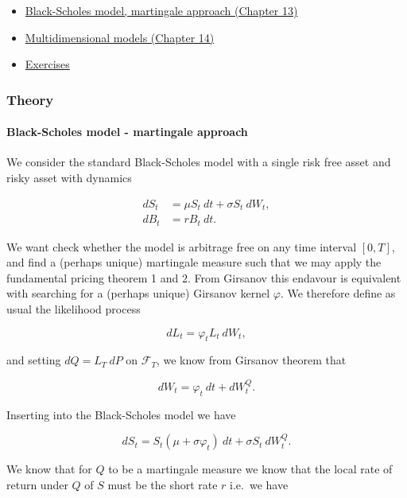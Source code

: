 \documentclass[
]{article}
\begin{document}
\begin{itemize}
\item
  \protect\hyperlink{black-scholes-model-martingale-approach}{Black-Scholes
  model, martingale approach (Chapter 13)}
\item
  \protect\hyperlink{multidimensional-models}{Multidimensional models
  (Chapter 14)}
\item
  \protect\hyperlink{exercises-week-6}{Exercises}
\end{itemize}

\hypertarget{theory-5}{%
\subsubsection{Theory}\label{theory-5}}

\hypertarget{black-scholes-model---martingale-approach}{%
\paragraph{Black-Scholes model - martingale
approach}\label{black-scholes-model---martingale-approach}}

We consider the standard Black-Scholes model with a single risk free
asset and risky asset with dynamics

\begin{align*}
dS_t &= \mu S_t\ dt+\sigma S_t\ dW_t,\\
dB_t &= r B_t\ dt.
\end{align*}

We want check whether the model is arbitrage free on any time interval
\([0,T]\), and find a (perhaps unique) martingale measure such that we
may apply the fundamental pricing theorem 1 and 2. From Girsanov this
endavour is equivalent with searching for a (perhaps unique) Girsanov
kernel \(\varphi\). We therefore define as usual the likelihood process

\[
dL_t=\varphi_ tL_t\ dW_t,
\]

and setting \(dQ=L_T\ dP\) on \(\mathcal{F}_T\), we know from Girsanov
theorem that

\[
dW_t=\varphi_t\ dt+dW_t^Q.
\]

Inserting into the Black-Scholes model we have

\[
dS_t=S_t(\mu + \sigma \varphi_t)\ dt+\sigma S_t\ dW_t^Q.
\]

We know that for \(Q\) to be a martingale measure we know that the local
rate of return under \(Q\) of \(S\) must be the short rate \(r\) i.e.~we
have
\end{document}
